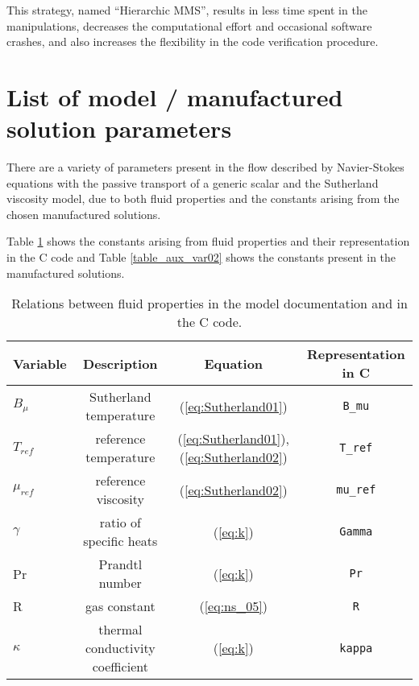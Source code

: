 \documentclass[10pt]{article}
\begin{document}
This strategy, named ``Hierarchic MMS'', results in less time spent in the manipulations, decreases the computational effort and occasional software crashes, and also increases the flexibility in the code verification procedure.

\appendix


\section{List of model / manufactured solution parameters}\label{Appendix:01}

There are a variety of parameters present in the flow described by Navier-Stokes equations with the passive transport of a generic scalar and the Sutherland viscosity model, due to both fluid properties and the constants arising from the chosen manufactured solutions.



Table \ref{table_aux_var} shows the constants arising from fluid properties and their representation in the C code and Table \ref{table_aux_var02} shows the constants present in the manufactured solutions.


\begin{table}[p]
\caption{Relations between fluid properties in the model documentation and in the C code.}
\centering
\begin{tabular}{l c c c}
\hline\hline
     Variable    &  Description & Equation &Representation in C  \\ [0.25ex]
\hline 
$B_\mu$   	& Sutherland temperature			& (\ref{eq:Sutherland01})  & \texttt{B\_mu}	 \vspace{2pt} \\
$T_{ref}$ 	& reference temperature				& (\ref{eq:Sutherland01}), (\ref{eq:Sutherland02})	& \texttt{T\_ref}		\vspace{2pt} \\
$\mu_{ref}$	& reference viscosity				& (\ref{eq:Sutherland02}) & \texttt{mu\_ref} \vspace{2pt} \\
$\gamma$	& ratio of specific heats			& (\ref{eq:k})			  & \texttt{Gamma}	 \vspace{2pt} \\
Pr			& Prandtl number					& (\ref{eq:k})			  & \texttt{Pr}		 \vspace{2pt} \\
R			& gas constant						& (\ref{eq:ns_05})		  & \texttt{R}		 \vspace{2pt} \\
$\kappa$    & thermal conductivity coefficient  & (\ref{eq:k})            & \texttt{kappa}   \vspace{2pt} \\
\hline
\end{tabular}
\label{table_aux_var}
\end{table}
\end{document}
